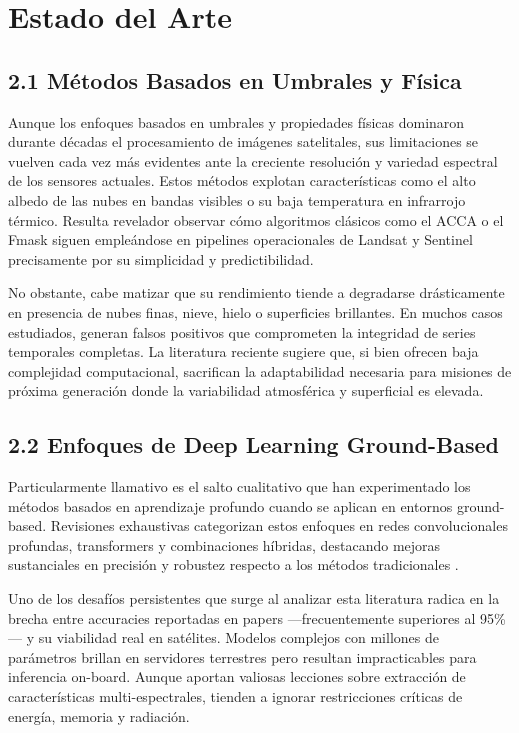 \section{Estado del Arte}

\subsection{2.1 Métodos Basados en Umbrales y Física}

Aunque los enfoques basados en umbrales y propiedades físicas dominaron durante décadas el procesamiento de imágenes satelitales, sus limitaciones se vuelven cada vez más evidentes ante la creciente resolución y variedad espectral de los sensores actuales. Estos métodos explotan características como el alto albedo de las nubes en bandas visibles o su baja temperatura en infrarrojo térmico. Resulta revelador observar cómo algoritmos clásicos como el ACCA o el Fmask siguen empleándose en pipelines operacionales de Landsat y Sentinel precisamente por su simplicidad y predictibilidad.

No obstante, cabe matizar que su rendimiento tiende a degradarse drásticamente en presencia de nubes finas, nieve, hielo o superficies brillantes. En muchos casos estudiados, generan falsos positivos que comprometen la integridad de series temporales completas. La literatura reciente sugiere que, si bien ofrecen baja complejidad computacional, sacrifican la adaptabilidad necesaria para misiones de próxima generación donde la variabilidad atmosférica y superficial es elevada.

\subsection{2.2 Enfoques de Deep Learning Ground-Based}

Particularmente llamativo es el salto cualitativo que han experimentado los métodos basados en aprendizaje profundo cuando se aplican en entornos ground-based. Revisiones exhaustivas categorizan estos enfoques en redes convolucionales profundas, transformers y combinaciones híbridas, destacando mejoras sustanciales en precisión y robustez respecto a los métodos tradicionales \cite{Anzalone2024_Review}. 

Uno de los desafíos persistentes que surge al analizar esta literatura radica en la brecha entre accuracies reportadas en papers —frecuentemente superiores al 95\%— y su viabilidad real en satélites. Modelos complejos con millones de parámetros brillan en servidores terrestres pero resultan impracticables para inferencia on-board. Aunque aportan valiosas lecciones sobre extracción de características multi-espectrales, tienden a ignorar restricciones críticas de energía, memoria y radiación.

